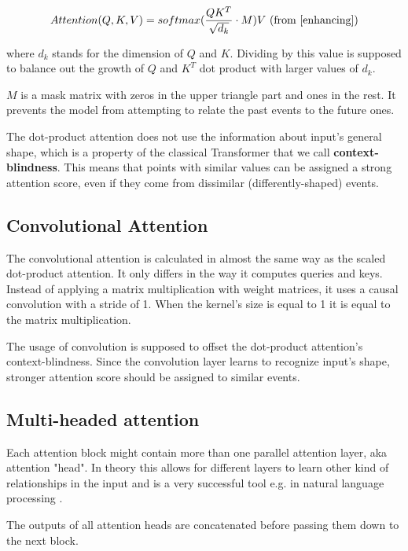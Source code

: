 \documentclass[en]{pracamgr}
\begin{document}
$$ Attention(Q, K, V) = softmax(\frac{QK^{T}}{\sqrt{d_k}} \cdot M)V \textrm{ (from \cite{enhancing})} $$

where $d_k$ stands for the dimension of $Q$ and $K$. Dividing by this value is supposed to balance out the growth of $Q$ and $K^{T}$ dot product with larger values of $d_k$.

$M$ is a mask matrix with zeros in the upper triangle part and ones in the rest. It prevents the model from attempting to relate the past events to the future ones.


The dot-product attention does not use the information about input's general shape, which is a property of the classical Transformer that we call \textbf{context-blindness}. This means that points with similar values can be assigned a strong attention score, even if they come from dissimilar (differently-shaped) events.

\subsection{Convolutional Attention}

The convolutional attention \cite{enhancing} is calculated in almost the same way as the scaled dot-product attention. 
It only differs in the way it computes queries and keys.
Instead of applying a matrix multiplication with weight matrices, it uses a causal convolution with a stride of 1. When the kernel's size is equal to 1 it is equal to the matrix multiplication.

The usage of convolution is supposed to offset the dot-product attention's context-blindness. Since the convolution layer learns to recognize input's shape, stronger attention score should be assigned to similar events.

\subsection{Multi-headed attention}

Each attention block might contain more than one parallel attention layer, aka attention "head". In theory this allows for different layers to learn other kind of relationships in the input and is a very successful tool e.g. in natural language processing \cite{tr}.

The outputs of all attention heads are concatenated before passing them down to the next block.


\end{document}

